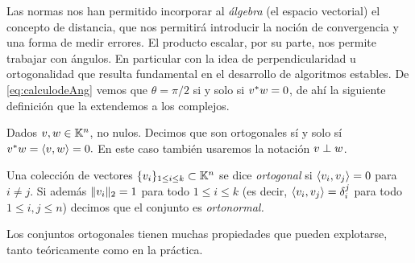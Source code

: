 \tcc
Las normas nos han permitido incorporar al \emph{álgebra} (el espacio vectorial) el concepto de distancia, que  nos permitirá introducir la noción de convergencia y una forma de medir errores.  El producto escalar, por su parte, nos permite trabajar con ángulos. En particular con la idea de perpendicularidad u ortogonalidad que resulta  fundamental en el desarrollo de algoritmos estables.
\etcc
De \eqref{eq:calculodeAng} vemos que $\theta=\pi/2$ si y solo si $\vb^*\wb=0$, de ahí la siguiente definición que la extendemos a los complejos.
\tccdefi
\begin{definicion}
 Dados $\vb,\wb\in\K^n$, no nulos. Decimos que son ortogonales sí y solo sí  $\vb^*\wb=\langle \vb,\wb\rangle=0.$ En este caso también usaremos la notación $\vb\perp \wb$.
\end{definicion}
\etcc
\tccdefi
\begin{definicion}
 Una colección de vectores  $\{\vb_i\}_{1\le i\le k}\subset \K^{n}$ se dice \emph{ortogonal} si $\langle \vb_i,\vb_j\rangle = 0$ para $i \neq j$. Si además $\|\vb_i\|_2=1$ para todo $1\le i\le k$ (es decir, $\langle \vb_i,\vb_j\rangle = \delta_i^j$ para todo $1 \le i, j \le n$) decimos que el conjunto es \emph{ortonormal.}
\end{definicion}
\etcc
Los conjuntos ortogonales tienen muchas propiedades que pueden explotarse, tanto teóricamente como en la práctica.

